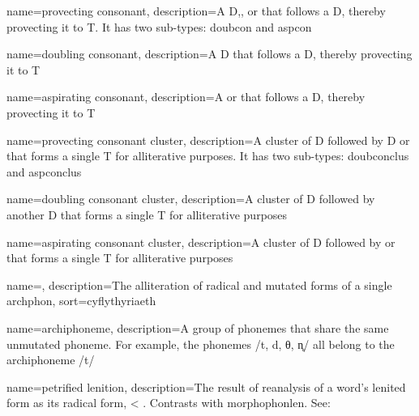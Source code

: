 \usepackage[%
            xindy,
            toc,
            ]{glossaries}
\usepackage{glossary-mcols}

\makeglossaries
\usepackage[xindy]{imakeidx}
\makeindex


{
    name=provecting consonant,
    description={A \gls{D},, or  that follows a \gls{D}, thereby provecting it to \gls{T}. It has two sub-types: \gls{doubcon} and \gls{aspcon}}
}

{
    name=doubling consonant,
    description={A \gls{D} that follows a \gls{D}, thereby provecting it to \gls{T}}
}

{
    name=aspirating consonant,
    description={A  or  that follows a \gls{D}, thereby provecting it to \gls{T}}
}

{
    name=provecting consonant cluster,
    description={A cluster of \gls{D} followed by \gls{D} or  that forms a single \gls{T} for alliterative purposes. It has two sub-types: \gls{doubconclus} and \gls{aspconclus}}
}

{
    name=doubling consonant cluster,
    description={A cluster of \gls{D} followed by another \gls{D} that forms a single \gls{T} for alliterative purposes}
}

{
    name=aspirating consonant cluster,
    description={A cluster of \gls{D} followed by  or  that forms a single \gls{T} for alliterative purposes}
}

{
    name={},
    description={The alliteration of radical and mutated forms of a single \gls{archphon}},
    sort={cyflythyriaeth}
}

{
    name={archi\-phoneme},
    description={A group of phonemes that share the same unmutated phoneme. For example, the phonemes /t, d, θ, n̥/ all belong to the archiphoneme /t/}
}


{
  name={petrified lenition},
  description={The result of reanalysis of a word's lenited form as its radical form, \eg {} < . Contrasts with \gls{morphophonlen}. See: }
}

